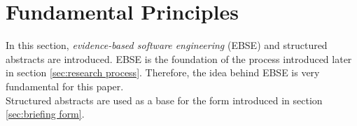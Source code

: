 
\section {Fundamental Principles}
\label{sec:fundamental principles}
In this section, \emph{evidence-based software engineering} (EBSE) and structured abstracts are introduced. EBSE is the foundation of the process introduced later in section \ref{sec:research process}. Therefore, the idea behind EBSE is very fundamental  for this paper.\\
Structured abstracts are used as a base for the form introduced in section \ref{sec:briefing form}.\\
